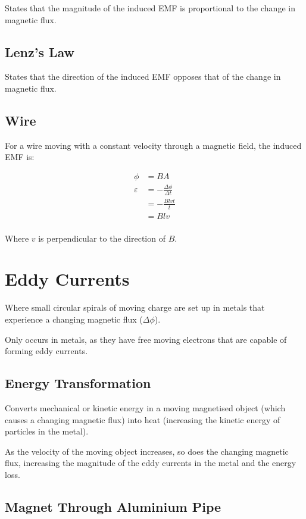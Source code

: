\documentclass[a4paper,11pt]{report}
\begin{document}
States that the magnitude of the induced EMF is proportional to the change in
magnetic flux.

\subsection{Lenz's Law}

States that the direction of the induced EMF opposes that of the change in
magnetic flux.

\subsection{Wire}

For a wire moving with a constant velocity through a magnetic field, the induced
EMF is:

$$
\begin{aligned}
\phi & = BA \\
\varepsilon & = -\frac{\Delta \phi}{\Delta t} \\
& = -\frac{Blvt}{t} \\
& = Blv \\
\end{aligned}
$$

Where $v$ is perpendicular to the direction of $B$.


\section{Eddy Currents}

Where small circular spirals of moving charge are set up in metals that
experience a changing magnetic flux ($\Delta \phi$).

Only occurs in metals, as they have free moving electrons that are capable of
forming eddy currents.

\subsection{Energy Transformation}

Converts mechanical or kinetic energy in a moving magnetised object (which
causes a changing magnetic flux) into heat (increasing the kinetic energy of
particles in the metal).

As the velocity of the moving object increases, so does the changing magnetic
flux, increasing the magnitude of the eddy currents in the metal and the energy
loss.

\subsection{Magnet Through Aluminium Pipe}
\end{document}
